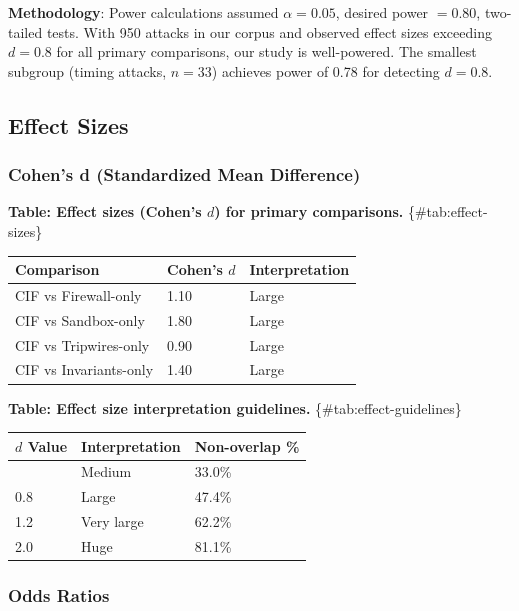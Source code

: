 \documentclass[
]{article}
\newcounter{none} %
\begin{document}
\textbf{Methodology}: Power calculations assumed \(\alpha = 0.05\),
desired power \(= 0.80\), two-tailed tests. With 950 attacks in our
corpus and observed effect sizes exceeding \(d = 0.8\) for all primary
comparisons, our study is well-powered. The smallest subgroup (timing
attacks, \(n = 33\)) achieves power of 0.78 for detecting \(d = 0.8\).

\subsection{Effect Sizes}\label{sec:effect-sizes}

\subsubsection{Cohen's d (Standardized Mean
Difference)}\label{sec:cohens-d}

\textbf{Table: Effect sizes (Cohen's \(d\)) for primary comparisons.}
\{\#tab:effect-sizes\}

{\def\LTcaptype{none} %
\begin{longtable}[]{@{}lll@{}}
\toprule\noalign{}
Comparison & Cohen's \(d\) & Interpretation \\
\midrule\noalign{}
\endhead
\bottomrule\noalign{}
\endlastfoot
CIF vs Firewall-only & 1.10 & Large \\
CIF vs Sandbox-only & 1.80 & Large \\
CIF vs Tripwires-only & 0.90 & Large \\
CIF vs Invariants-only & 1.40 & Large \\
\end{longtable}
}

\textbf{Table: Effect size interpretation guidelines.}
\{\#tab:effect-guidelines\}

{\def\LTcaptype{none} %
\begin{longtable}[]{@{}lll@{}}
\toprule\noalign{}
\(d\) Value & Interpretation & Non-overlap \% \\
\midrule\noalign{}
\endhead
\bottomrule\noalign{}
\endlastfoot
0.5 & Medium & 33.0\% \\
0.8 & Large & 47.4\% \\
1.2 & Very large & 62.2\% \\
2.0 & Huge & 81.1\% \\
\end{longtable}
}

\subsubsection{Odds Ratios}\label{sec:odds-ratios}
\end{document}
